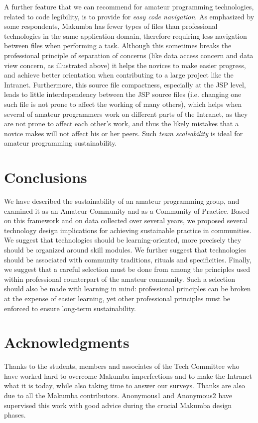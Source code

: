 \documentclass{sig-alt-release2}
\begin{document}
A further feature that we can recommend for amateur programming technologies, related to code legibility, is to provide for \textit{easy code navigation}.  As emphasized by some respondents, Makumba has fewer types of files than professional technologies in the same application domain, therefore requiring less navigation between files when performing a task. Although this sometimes breaks the professional principle of separation of concerns (like data access concern and data view concern, as illustrated above) it helps the novices to make easier progress, and achieve better orientation when contributing to a large project like the Intranet. Furthermore, this source file compactness, especially at the JSP level, leads to little interdependency between the JSP source files (i.e. changing one such file is not prone to affect the working of many others), which helps when several of amateur programmers work on different parts of the Intranet, as they are not prone to affect each other's work, and thus the likely mistakes that a novice makes will not affect his or her peers. Such \textit{team scaleability} is ideal for amateur programming sustainability.

\section{Conclusions}\label{sec:conclusions}
We have described the sustainability of an amateur programming group, and examined it as an Amateur Community and as a Community of Practice. Based on this framework and on data collected over several years, we proposed several technology design implications for achieving sustainable practice in communities. We suggest that technologies should be learning-oriented, more precisely they should be organized around skill modules. We further suggest that technologies should be associated with community traditions, rituals and specificities. Finally, we suggest that a careful selection must be done from among the principles used within professional counterpart of the amateur community. Such a selection should also be made with learning in mind: professional principles can be broken at the expense of easier learning, yet other professional principles must be enforced to ensure long-term sustainability.

\section{Acknowledgments}\label{sec:acknowledgments}
Thanks to the students, members and associates of the Tech Committee who have worked hard to overcome Makumba imperfections and to make the Intranet what it is today, while also taking time to answer our surveys.  Thanks are also due to all the Makumba contributors.  Anonymous1 and Anonymous2 have supervised this work with good advice during the crucial Makumba design phases.
\end{document}
